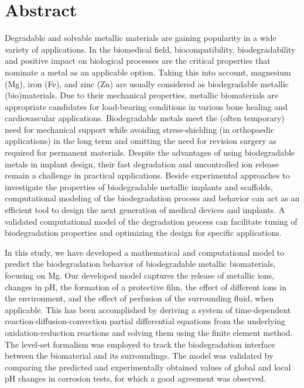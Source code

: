 \chapter{Abstract}                                 \label{ch:abstract}

Degradable and solvable metallic materials are gaining popularity in a wide variety of applications. In the biomedical field, biocompatibility, biodegradability and positive impact on biological processes are the critical properties that nominate a metal as an applicable option. Taking this into account, magnesium (Mg), iron (Fe), and zinc (Zn) are usually considered as biodegradable metallic (bio)materials. Due to their mechanical properties, metallic biomaterials are appropriate candidates for load-bearing conditions in various bone healing and cardiovascular applications. Biodegradable metals meet the (often temporary) need for mechanical support while avoiding stress-shielding (in orthopaedic applications) in the long term and omitting the need for revision surgery as required for permanent materials.  Despite the advantages of using biodegradable metals in implant design, their fast degradation and uncontrolled ion release remain a challenge in practical applications. Beside experimental approaches to investigate the properties of biodegradable metallic implants and scaffolds, computational modeling of the biodegradation process and behavior can act as an efficient tool to design the next generation of medical devices and implants. A validated computational model of the degradation process can facilitate tuning of biodegradation properties and optimizing the design for specific applications. 

In this study, we have developed a mathematical and computational model to predict the biodegradation behavior of biodegradable metallic biomaterials, focusing on Mg. Our developed model captures the release of metallic ions, changes in pH, the formation of a protective film, the effect of different ions in the environment, and the effect of perfusion of the surrounding fluid, when applicable. This has been accomplished by deriving a system of time-dependent reaction-diffusion-convection partial differential equations from the underlying oxidation-reduction reactions and solving them using the finite element method. The level-set formalism was employed to track the biodegradation interface between the biomaterial and its surroundings. The model was validated by comparing the predicted and experimentally obtained values of global and local pH changes in corrosion tests, for which a good agreement was observed. 

